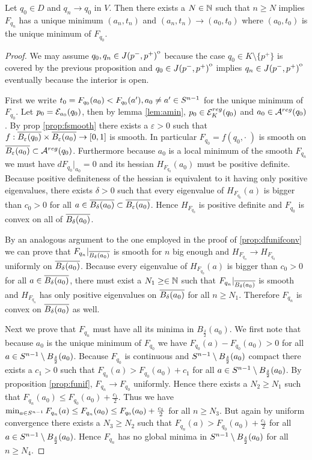 \begin{proposition}\label{prop:globalminconv}
    Let $q_0\in D$ and $q_n\to q_0$ in $V$. Then there exists a $N\in \mathbb{N}$ such that $n\ge N$ implies $F_{q_n}$ has a unique minimum $(a_n,t_n)$ and $(a_n,t_n)\to (a_0,t_0)$ where $(a_0,t_0)$ is the unique minimum of $F_{q_0}$.
\end{proposition}
\begin{proof}
    We may assume $q_0,q_n \in {\kern0ptJ(p^-,p^+)}^{\mathrm{o}}$ because the case $q_0\in K\setminus\{p^+\}$ is covered by the previous proposition and $q_0\in {\kern0ptJ(p^-,p^+)}^{\mathrm{o}}$ implies $q_n\in {\kern0ptJ(p^-,p^+)}^{\mathrm{o}}$ eventually because the interior is open.

    First we write $t_0=F_{q_0}(a_0)<F_{q_0}(a'), a_0\neq a'\in {S^{n-1}}$ for the unique minimum of $F_{q_0}$. Let $p_0 = {\mathcal{E}}_{a_0}(q_0)$, then by lemma \ref{lem:amin}, $p_0\in {{\mathcal{E}}^{reg}_K}(q_0)$ and $a_0\in {{\mathcal{A}}^{reg}}(q_0)$. By prop \ref{prop:fsmooth} there exists a $\varepsilon>0$ such that $f:{\overline{B_\varepsilon(q_0)}}\times{\overline{B_\varepsilon(a_0)}}\to [0,1]$ is smooth. In particular $F_{q_0}=f(q_0,\cdot\;)$ is smooth on ${\overline{B_\varepsilon(a_0)}}\subset {{\mathcal{A}}^{reg}}(q_0)$. Furthermore because $a_0$ is a local minimum of the smooth $F_{q_n}$ we must have $dF_{q_0}\rvert_{a_0}=0$ and its hessian $H_{F_{q_0}}(a_0)$ must be positive definite. Because positive definiteness of the hessian is equivalent to it having only positive eigenvalues, there exists $\delta>0$ such that every eigenvalue of $H_{F_{q_0}}(a)$ is bigger than $c_0>0$ for all $a\in {\overline{B_\delta(a_0)}}\subset {\overline{B_\varepsilon(a_0)}}$. Hence $H_{F_{q_0}}$ is positive definite and $F_{q_0}$ is convex on all of ${\overline{B_\delta(a_0)}}$.

    By an analogous argument to the one employed in the proof of \ref{prop:dfunifconv} we can prove that $F_{q_n}\rvert_{{\overline{B_\delta(a_0)}}}$ is smooth for $n$ big enough and $H_{F_{q_n}}\to H_{F_{q_0}}$ uniformly on ${\overline{B_\delta(a_0)}}$. Because every eigenvalue of $H_{F_{q_0}}(a)$ is bigger than $c_0>0$ for all $a\in {\overline{B_\delta(a_0)}}$, there must exist a $N_1\ge \in \mathbb{N}$ such that $F_{q_n}\rvert_{{\overline{B_\delta(a_0)}}}$ is smooth and $H_{F_{q_n}}$ has only positive eigenvalues on ${\overline{B_\delta(a_0)}}$ for all $n \ge N_1$. Therefore $F_{q_n}$ is convex on ${\overline{B_\delta(a_0)}}$ as well.
    
    Next we prove that $F_{q_n}$ must have all its minima in $B_{\frac{\delta}{2}}(a_0)$. We first note that because $a_0$ is the unique minimum of $F_{q_0}$ we have $F_{q_0}(a)-F_{q_0}(a_0)>0$ for all $a\in {S^{n-1}}\setminus B_{\frac{\delta}{2}}(a_0)$. Because $F_{q_0}$ is continuous and ${S^{n-1}}\setminus B_{\frac{\delta}{2}}(a_0)$ compact there exists a $c_1>0$ such that $F_{q_0}(a)> F_{q_0}(a_0) + c_1$ for all $a\in {S^{n-1}}\setminus B_{\frac{\delta}{2}}(a_0)$. By proposition \ref{prop:funif}, $F_{q_n}\to F_{q_0}$ uniformly. Hence there exists a $N_2\ge N_1$ such that $F_{q_n}(a_0)\leq F_{q_0}(a_0)+\frac{c_1}{2}$. Thus we have $\min_{a\in {S^{n-1}}}F_{q_n}(a) \leq F_{q_n}(a_0) \leq F_{q_0}(a_0)+\frac{c_1}{2}$ for all $n\ge N_3$. But again by uniform convergence there exists a $N_3\ge N_2$ such that $F_{q_n}(a) > F_{q_0}(a_0)+\frac{c_1}{2}$ for all $a\in {S^{n-1}}\setminus B_{\frac{\delta}{2}}(a_0)$. Hence $F_{q_n}$ has no global minima in ${S^{n-1}}\setminus B_{\frac{\delta}{2}}(a_0)$ for all $n\ge N_4$.


\end{proof}
